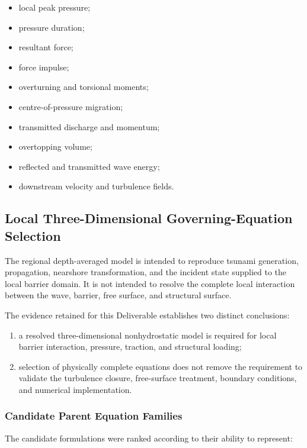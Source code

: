 \begin{itemize}
  \item local peak pressure;
  \item pressure duration;
  \item resultant force;
  \item force impulse;
  \item overturning and torsional moments;
  \item centre-of-pressure migration;
  \item transmitted discharge and momentum;
  \item overtopping volume;
  \item reflected and transmitted wave energy;
  \item downstream velocity and turbulence fields.
\end{itemize}

\subsection{Local Three-Dimensional Governing-Equation Selection}
\label{sec:res-mod-eqs-local-three-dimensional-selection}

The regional depth-averaged model is intended to reproduce tsunami
generation, propagation, nearshore transformation, and the incident
state supplied to the local barrier domain. It is not intended to
resolve the complete local interaction between the wave, barrier,
free surface, and structural surface.

The evidence retained for this Deliverable establishes two distinct
conclusions:

\begin{enumerate}
  \item a resolved three-dimensional nonhydrostatic model is required
    for local barrier interaction, pressure, traction, and
    structural loading;
  \item selection of physically complete equations does not remove
    the requirement to validate the turbulence closure,
    free-surface treatment, boundary conditions, and numerical
    implementation.
\end{enumerate}

\subsubsection{Candidate Parent Equation Families}
\label{sec:res-mod-eqs-local-candidate-families}

The candidate formulations were ranked according to their ability to
represent:

